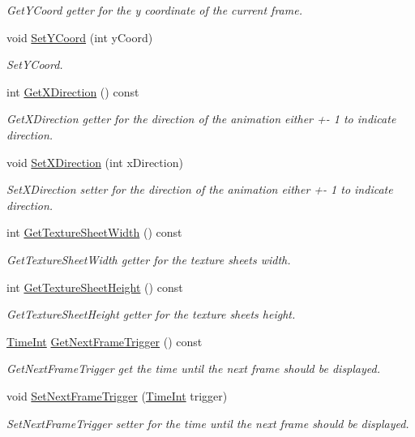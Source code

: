 \begin{DoxyCompactItemize}
\begin{DoxyCompactList}\small\item\em Get\-Y\-Coord getter for the y coordinate of the current frame. \end{DoxyCompactList}\item 
void \hyperlink{class_player_ae2b9268a010501d169798c201be0aea0}{Set\-Y\-Coord} (int y\-Coord)
\begin{DoxyCompactList}\small\item\em Set\-Y\-Coord. \end{DoxyCompactList}\item 
int \hyperlink{class_player_a0b6c9a9030fe30e04bd00f423d617b72}{Get\-X\-Direction} () const 
\begin{DoxyCompactList}\small\item\em Get\-X\-Direction getter for the direction of the animation either +-\/ 1 to indicate direction. \end{DoxyCompactList}\item 
void \hyperlink{class_player_ad1d525ce156cc87325d671faa537c644}{Set\-X\-Direction} (int x\-Direction)
\begin{DoxyCompactList}\small\item\em Set\-X\-Direction setter for the direction of the animation either +-\/ 1 to indicate direction. \end{DoxyCompactList}\item 
int \hyperlink{class_player_afd3cdd13b6de01c1a52ce47a5871df65}{Get\-Texture\-Sheet\-Width} () const 
\begin{DoxyCompactList}\small\item\em Get\-Texture\-Sheet\-Width getter for the texture sheets width. \end{DoxyCompactList}\item 
int \hyperlink{class_player_adbce7ab22e580ba85cd9a3fddac9695f}{Get\-Texture\-Sheet\-Height} () const 
\begin{DoxyCompactList}\small\item\em Get\-Texture\-Sheet\-Height getter for the texture sheets height. \end{DoxyCompactList}\item 
\hyperlink{_game_8hpp_a332b72dfb4bc8b4c16b8dc43864fe343}{Time\-Int} \hyperlink{class_player_a8cf47bf652a24ea4826c04810251e332}{Get\-Next\-Frame\-Trigger} () const 
\begin{DoxyCompactList}\small\item\em Get\-Next\-Frame\-Trigger get the time until the next frame should be displayed. \end{DoxyCompactList}\item 
void \hyperlink{class_player_a34ee83b70e69a08c2f397a05ab6421b9}{Set\-Next\-Frame\-Trigger} (\hyperlink{_game_8hpp_a332b72dfb4bc8b4c16b8dc43864fe343}{Time\-Int} trigger)
\begin{DoxyCompactList}\small\item\em Set\-Next\-Frame\-Trigger setter for the time until the next frame should be displayed. \end{DoxyCompactList}\end{DoxyCompactItemize}
